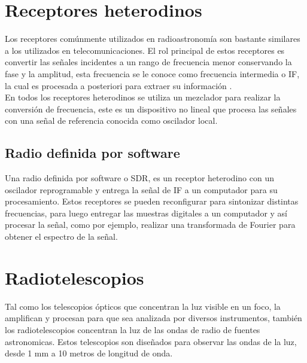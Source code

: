 \section{Receptores heterodinos}

Los receptores comúnmente utilizados en radioastronomía son bastante similares a los utilizados en telecomunicaciones. El rol principal de estos receptores es convertir las señales incidentes a un rango de frecuencia menor conservando la fase y la amplitud, esta frecuencia se le conoce como frecuencia intermedia o IF, la cual es procesada a posteriori para extraer su información \cite{Finger2013}.\\

En todos los receptores heterodinos se utiliza un mezclador para realizar la conversión de frecuencia, este es un dispositivo no lineal que procesa las señales con una señal de referencia conocida como oscilador local.\\


\subsection{Radio definida por software}

Una radio definida por software o SDR, es un receptor heterodino con un oscilador reprogramable y entrega la señal de IF a un computador para su procesamiento. Estos receptores se pueden reconfigurar para sintonizar distintas frecuencias, para luego entregar las muestras digitales a un computador y así procesar la señal, como por ejemplo, realizar una transformada de Fourier para obtener el espectro de la señal.\\





\section{Radiotelescopios}

Tal como los telescopios ópticos que concentran la luz visible en un foco, la amplifican y procesan para que sea analizada por diversos instrumentos, también los radiotelescopios concentran la luz de las ondas de radio de fuentes astronomicas. Estos telescopios son diseñados para observar las ondas de la luz, desde 1 mm a 10 metros de longitud de onda. \cite{nraoRadioTelescopes}\\

